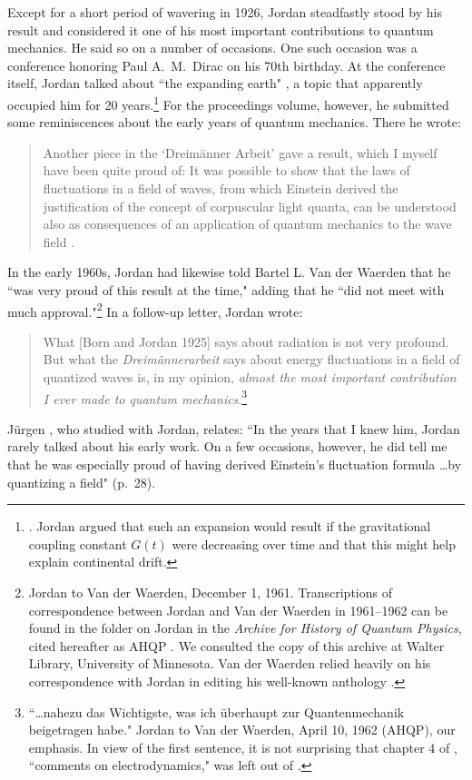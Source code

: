 \documentclass{elsart}
\begin{document}
Except for a short period of wavering in 1926, Jordan steadfastly stood by his result and considered it one of his most important contributions to quantum mechanics. He said so on a number of occasions. One such occasion was  a conference honoring Paul A.\ M.\ Dirac on his 70th birthday. At the conference itself, Jordan talked about ``the expanding earth" \citep[p.\ 822]{Mehra 1973}, a topic that apparently occupied him for 20 years.\footnote{\citep[p.\ 124]{Kundt 2007}. Jordan argued that such an expansion would result if the gravitational coupling constant $G(t)$ were decreasing over time and that this might help explain continental drift.}
For the proceedings volume, however, he submitted some reminiscences about the early years of quantum mechanics. There he wrote: 
\begin{quotation}
Another piece in the `Dreim\"anner Arbeit' gave a result, which I myself have been quite proud of: It was possible to show that the laws of fluctuations in a field of waves, from which Einstein derived the justification of the concept of corpuscular light quanta, can be understood also as consequences of an application of quantum mechanics to the wave field \citep[p.\ 296]{Jordan 1973}.
\end{quotation}
In the early 1960s, Jordan had likewise told  Bartel L. Van der Waerden that he ``was very proud of this result at the time," adding that he ``did not meet with much approval."\footnote{\label{letter120161}Jordan to Van der Waerden, December 1, 1961. Transcriptions of correspondence between Jordan and Van der Waerden in 1961--1962 can be found in the folder on Jordan in the {\it Archive for History of Quantum Physics}, cited hereafter as AHQP \citep{Kuhn et al. 1967}. We consulted the copy of this archive at Walter Library, University of Minnesota. Van der Waerden relied heavily on his correspondence with Jordan in editing his well-known anthology \citep{Van der Waerden}.} In a follow-up letter, Jordan wrote:
\begin{quotation}
What [Born and Jordan 1925]  says about radiation is not very profound. But what the {\it Dreim\"annerarbeit} says about energy fluctuations in a field of quantized waves is, in my opinion, {\it almost the most important contribution I ever made to quantum mechanics}.\footnote{\label{letter041062}``\ldots nahezu das Wichtigste, was ich \"uberhaupt zur Quantenmechanik beigetragen habe." Jordan to Van der Waerden, April 10, 1962 (AHQP), our emphasis. In view of the first sentence, it is not surprising that  chapter 4 of \citep{Born and Jordan 1925}, ``comments on electrodynamics," was left out of \citep{Van der Waerden}.}
\end{quotation}
J\"urgen \citet{Ehlers 2007}, who studied with Jordan, relates: ``In the years that I knew him, Jordan rarely talked about his early work. On a few occasions, however, he did tell me that he was especially proud of having derived Einstein's fluctuation formula \ldots by quantizing a field" (p.\ 28).
\end{document}

